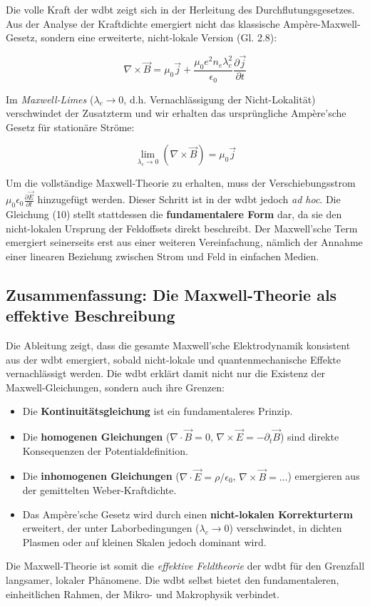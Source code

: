 Die volle Kraft der \gls{wdbt} zeigt sich in der Herleitung des Durchflutungsgesetzes. Aus der Analyse der Kraftdichte emergiert nicht das klassische Ampère-Maxwell-Gesetz, sondern eine erweiterte,
nicht-lokale Version (Gl. 2.8):

\begin{equation}
    \nabla \times \vec{B} = \mu_0 \vec{j} + \frac{\mu_0 e^2 n_e \lambda_c^2}{\epsilon_0} \frac{\partial \vec{j}}{\partial t}
\end{equation}

Im \textit{Maxwell-Limes} ($\lambda_c \rightarrow 0$, d.h. Vernachlässigung der Nicht-Lokalität) verschwindet der Zusatzterm und wir erhalten das ursprüngliche Ampère'sche Gesetz für stationäre Ströme:

\begin{equation}
    \lim_{\lambda_c \to 0} \left( \nabla \times \vec{B} \right) = \mu_0 \vec{j}
\end{equation}

Um die vollständige Maxwell-Theorie zu erhalten, muss der Verschiebungsstrom $\mu_0 \epsilon_0 \frac{\partial \vec{E}}{\partial t}$ hinzugefügt werden. Dieser Schritt ist in der \gls{wdbt}
jedoch \textit{ad hoc}. Die Gleichung (10) stellt stattdessen die \textbf{fundamentalere Form} dar, da sie den nicht-lokalen Ursprung der Feldoffsets direkt beschreibt. Der Maxwell'sche Term
emergiert seinerseits erst aus einer weiteren Vereinfachung, nämlich der Annahme einer linearen Beziehung zwischen Strom und Feld in einfachen Medien.

\subsection{Zusammenfassung: Die Maxwell-Theorie als effektive Beschreibung}

Die Ableitung zeigt, dass die gesamte Maxwell'sche Elektrodynamik konsistent aus der \gls{wdbt} emergiert, sobald nicht-lokale und quantenmechanische Effekte vernachlässigt werden. Die \gls{wdbt}
erklärt damit nicht nur die Existenz der Maxwell-Gleichungen, sondern auch ihre Grenzen:

\begin{itemize}
    \item Die \textbf{Kontinuitätsgleichung} ist ein fundamentaleres Prinzip.
    \item Die \textbf{homogenen Gleichungen} ($\nabla \cdot \vec{B} = 0$, $\nabla \times \vec{E} = -\partial_t \vec{B}$) sind direkte Konsequenzen der Potentialdefinition.
    \item Die \textbf{inhomogenen Gleichungen} ($\nabla \cdot \vec{E} = \rho/\epsilon_0$, $\nabla \times \vec{B} = \ldots$) emergieren aus der gemittelten Weber-Kraftdichte.
    \item Das Ampère'sche Gesetz wird durch einen \textbf{nicht-lokalen Korrekturterm} erweitert, der unter Laborbedingungen ($\lambda_c \rightarrow 0$) verschwindet, in dichten Plasmen oder auf kleinen Skalen jedoch dominant wird.
\end{itemize}

Die Maxwell-Theorie ist somit die \textit{effektive Feldtheorie} der \gls{wdbt} für den Grenzfall langsamer, lokaler Phänomene. Die \gls{wdbt} selbst bietet den fundamentaleren, einheitlichen Rahmen,
der Mikro- und Makrophysik verbindet.
